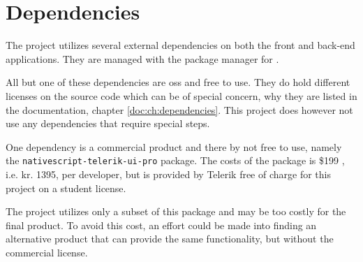 \chapter{Dependencies}
\label{ch:dependencies}
The project utilizes several external dependencies on both the front and back-end applications.
They are managed with the package manager  for .

All but one of these dependencies are \gls{oss} and free to use.
They do hold different licenses on the source code which can be of special concern, why they are listed in the documentation, chapter \ref{doc:ch:dependencies}. 
This project does however not use any dependencies that require special steps.

One dependency is a commercial product and there by not free to use, namely the \verb+nativescript-telerik-ui-pro+ package.
The costs of the package is \$199 \citep{dependencies:nativescript}, i.e. kr. 1395, per developer, but is provided by Telerik free of charge for this project on a student license.

The project utilizes only a subset of this package and may be too costly for the final product.
To avoid this cost, an effort could be made into finding an alternative product that can provide the same functionality, but without the commercial license.
